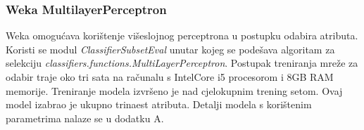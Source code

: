 \subsubsection*{Weka MultilayerPerceptron}
Weka omogućava korištenje višeslojnog perceptrona u postupku odabira atributa. Koristi se modul \textit{ClassifierSubsetEval} unutar kojeg se podešava algoritam za selekciju \textit{classifiers.functions.MultiLayerPerceptron}. Postupak treniranja mreže za odabir traje oko tri sata na računalu s IntelCore i5 procesorom i 8GB RAM memorije. Treniranje modela izvršeno je nad cjelokupnim trening setom. Ovaj model izabrao je ukupno trinaest atributa. Detalji modela s korištenim parametrima nalaze se u dodatku A.
